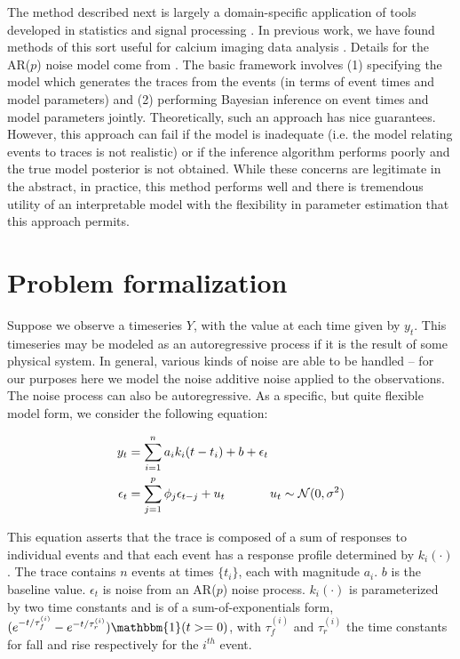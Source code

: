 \documentclass{article}
\begin{document}
The method described next is largely a domain-specific application of tools developed in statistics \cite{moller2004} and signal processing \cite{tan2008}.  In previous work, we have found methods of this sort useful for calcium imaging data analysis \cite{pnevmatikakis2013bayesian}.  Details for the AR($p$) noise model come from \cite{chib1994bayes}.  The basic framework involves (1) specifying the model which generates the traces from the events (in terms of event times and model parameters) and (2) performing Bayesian inference on event times and model parameters jointly.  Theoretically, such an approach has nice guarantees.  However, this approach can fail if the model is inadequate (i.e. the model relating events to traces is not realistic) or if the inference algorithm performs poorly and the true model posterior is not obtained.  While these concerns are legitimate in the abstract, in practice, this method performs well and there is tremendous utility of an interpretable model with the flexibility in parameter estimation that this approach permits.   

   
\section*{Problem formalization} 

Suppose we observe a timeseries $Y$, with the value at each time given by $y_t$.  This timeseries may be modeled as an autoregressive process if it is the result of some physical system.  In general, various kinds of noise are able to be handled -- for our purposes here we model the noise additive noise applied to the observations.  The noise process can also be autoregressive.  As a specific, but quite flexible model form, we consider the following equation:

\begin{align}
y_{t} &= \sum_{i=1}^n a_{i} k_i(t-t_{i}) + b + \epsilon_t \\
\epsilon_t &= \sum_{j=1}^p \phi_j \epsilon_{t-j} + u_t \hspace*{.5in} u_t \sim \mathcal{N}(0,\sigma^2) \label{AR_noise}
\end{align}

This equation asserts that the trace is composed of a sum of responses to individual events and that each event has a response profile determined by $k_i(\cdot)$.  The trace contains $n$ events at times $\{t_i\}$, each with magnitude $a_{i}$.  $b$ is the baseline value. $\epsilon_t$ is noise from an AR($p$) noise process. $k_i(\cdot)$ is parameterized by two time constants and is of a sum-of-exponentials form, $(e^{-t/\tau_f^{(i)}} - e^{-t/\tau_r^{(i)}})\mathbbm{1}(t>=0)$, with $\tau_f^{(i)}$ and $\tau_r^{(i)}$ the time constants for fall and rise respectively for the $i^{th}$ event.
\end{document}
